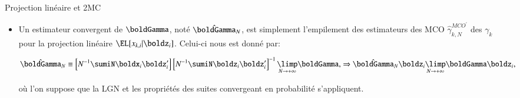 \begin{frame}[allowframebreaks]{Projection linéaire et 2MC}
\begin{itemize}
\item Un estimateur convergent de $\boldGamma$, noté $\hat{\boldGamma}_N$, 
est simplement l’empilement des estimateurs des MCO $\hat{\gamma}_{k, N}^{MCO^\prime}$  des $\gamma_k$ pour
la projection linéaire $\EL[x_{k, i} | \boldz_i]$. Celui-ci nous est donné par:

\begin{align}
\hat{\boldGamma}_N\equiv  \left[N^{-1}\sumiN\boldx_i\boldz_i^\prime\right]\left[N^{-1}\sumiN\boldz_i\boldz_i^\prime\right]^{-1}
\underset{N\to +\infty}{\limp} \boldGamma,
&\Rightarrow \hat{\boldGamma}_N\boldz_i \underset{N\to +\infty}{\limp} \boldGamma\boldz_i,
\label{eq20}
\end{align}

où l'on suppose que la LGN et les propriétés des suites convergeant en probabilité s’appliquent.
\end{itemize}
\end{frame}

